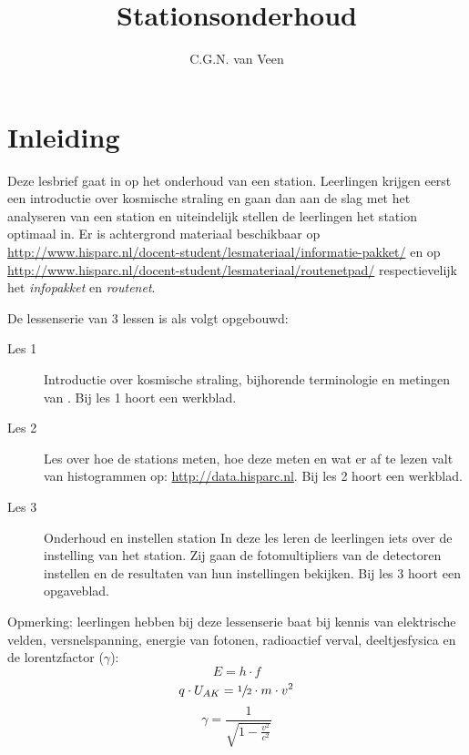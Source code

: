 
\usepackage{xfrac}

\title{Stationsonderhoud}
\author{C.G.N. van Veen}



\maketitle

\section{Inleiding}

Deze lesbrief gaat in op het onderhoud van een \hisparc station.
Leerlingen krijgen eerst een introductie over kosmische straling en gaan
dan aan de slag met het analyseren van een \hisparc station en
uiteindelijk stellen de leerlingen het station optimaal in. Er is
achtergrond materiaal beschikbaar op
\url{http://www.hisparc.nl/docent-student/lesmateriaal/informatie-pakket/} en
op \url{http://www.hisparc.nl/docent-student/lesmateriaal/routenetpad/} respectievelijk
het \textit{infopakket} en \textit{routenet}.

De lessenserie van 3 lessen is als volgt opgebouwd:
\begin{description}
    \item[Les 1] Introductie over kosmische straling, bijhorende terminologie en metingen van \hisparc.
    Bij les 1 hoort een werkblad.

    \item[Les 2] Les over hoe de stations meten, hoe deze meten en wat er af te lezen valt van
    histogrammen op: \url{http://data.hisparc.nl}.
    Bij les 2 hoort een werkblad.

    \item[Les 3] Onderhoud en instellen station
    In deze les leren de leerlingen iets over de instelling van het \hisparc station.
    Zij gaan de fotomultipliers van de detectoren instellen en de resultaten van
    hun instellingen bekijken. Bij les 3 hoort een opgaveblad.
\end{description}

Opmerking: leerlingen hebben bij deze lessenserie baat bij kennis van
elektrische velden, versnelspanning, energie van fotonen, radioactief verval,
deeltjesfysica en de lorentzfactor ($\gamma$):
\begin{equation}
    E = h \cdot f
\end{equation}
\begin{equation}
    q \cdot {U_{AK}} = \sfrac{1}{2} \cdot m \cdot {v^2}
\end{equation}
\begin{equation}
    \gamma = \frac{1}{\sqrt{1-\frac{v^2}{c^2}}}
\end{equation}

